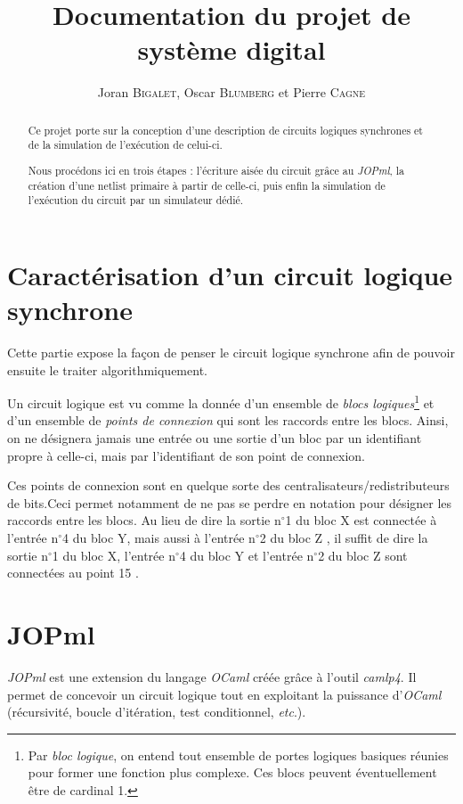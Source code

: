 \documentclass{article}
\title{Documentation du projet de système digital}
\author{Joran \textsc{Bigalet}, Oscar \textsc{Blumberg} et Pierre \textsc{Cagne}}
\date{}
\begin{document}
\maketitle
\thispagestyle{fancy}

\begin{abstract}
  Ce projet porte sur la conception d'une description de circuits
  logiques synchrones et de la simulation de l'exécution de celui-ci.

  Nous procédons ici en trois étapes : l'écriture aisée du circuit grâce au \emph{JOPml}, la création d'une netlist primaire à partir de celle-ci, puis enfin la simulation de l'exécution du circuit par un simulateur dédié.
\end{abstract}

\tableofcontents
\newpage

\section{Caractérisation d'un circuit logique synchrone}
Cette partie expose la façon de penser le circuit logique synchrone
afin de pouvoir ensuite le traiter algorithmiquement.

Un circuit logique est vu comme la donnée d'un ensemble de \emph{blocs
logiques}\footnote{Par \emph{bloc logique}, on entend tout ensemble de
portes logiques basiques réunies pour former une fonction plus
complexe. Ces blocs peuvent éventuellement être de cardinal 1.} et
d'un ensemble de \emph{points de connexion} qui sont les raccords
entre les blocs. Ainsi, on ne désignera jamais une entrée ou une
sortie d'un bloc par un identifiant propre à celle-ci, mais par
l'identifiant de son point de connexion.

Ces points de connexion sont en quelque sorte des
centralisateurs/redistributeurs de bits.Ceci permet notamment de ne
pas se perdre en notation pour désigner les raccords entre les blocs. Au lieu de dire \og la sortie n${}^\circ$1 du bloc X
est connectée à l'entrée n${}^\circ$4 du bloc Y, mais aussi à l'entrée n${}^\circ$2 du
bloc Z \fg, il suffit de dire \og la sortie n${}^\circ$1 du bloc X, l'entrée
n${}^\circ$4 du bloc Y et l'entrée n${}^\circ$2 du bloc Z sont connectées au point 15 \fg.

\section{JOPml}
\emph{JOPml} est une extension du langage \emph{OCaml} créée grâce à l'outil \emph{camlp4}. Il permet de concevoir un circuit logique tout en exploitant la puissance d'\emph{OCaml} (récursivité, boucle d'itération, test conditionnel, \emph{etc}.). 
\end{document}
